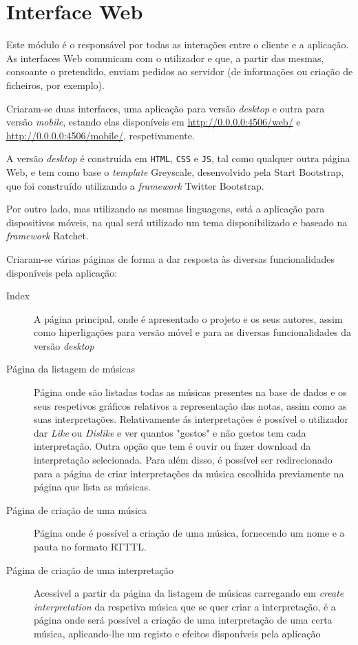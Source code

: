 \documentclass[a4paper,11pt,openright,oneside]{report}
\begin{document}
\section{Interface Web}
\label{sec.web}

Este módulo é o responsável por todas as interações entre o cliente e a aplicação. As interfaces Web comunicam com o utilizador e que, a partir das mesmas, consoante o pretendido, enviam pedidos ao servidor (de informações ou criação de ficheiros, por exemplo).

Criaram-se duas interfaces, uma aplicação para versão \textit{desktop} e outra para versão \textit{mobile}, estando elas disponíveis em \url{http://0.0.0.0:4506/web/} e \url{http://0.0.0.0:4506/mobile/}, respetivamente.

A versão \textit{desktop} é construída em \verb|HTML|, \verb|CSS| e \verb|JS|, tal como qualquer outra página Web, e tem como base o \textit{template} Greyscale, desenvolvido pela Start Bootstrap, que foi construído utilizando a \textit{framework} Twitter Bootstrap.

Por outro lado, mas utilizando as mesmas linguagens, está a aplicação para dispositivos móveis, na qual será utilizado um tema disponibilizado e baseado na \textit{framework} Ratchet.

Criaram-se várias páginas de forma a dar resposta às diversas funcionalidades disponíveis pela aplicação:

\begin{description}
\item[Index]
A página principal, onde é apresentado o projeto e os seus autores, assim como hiperligações para versão móvel e para as diversas funcionalidades da versão \textit{desktop}
\item[Página da listagem de músicas]
Página onde são listadas todas as músicas presentes na base de dados e os seus respetivos gráficos relativos a representação das notas, assim como as suas interpretações. Relativamente ás interpretações é possível o utilizador dar \textit{Like} ou \textit{Dislike} e ver quantos "gostos" e não gostos tem cada interpretação. Outra opção que tem é ouvir ou fazer download da interpretação selecionada. Para além disso, é possível ser redirecionado para a página de criar interpretações da música escolhida previamente na página que lista as músicas. 
\item[Página de criação de uma música]
Página onde é possível a criação de uma música, fornecendo um nome e a pauta no formato RTTTL.
\item[Página de criação de uma interpretação]
Acessível a partir da página da listagem de músicas carregando em \textit{create interpretation} da respetiva música que se quer criar a interpretação, é a página onde será possível a criação de uma interpretação de uma certa música, aplicando-lhe um registo e efeitos disponíveis pela aplicação
\end{description}
\end{document}
